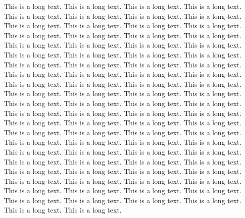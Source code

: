 \documentclass[twoside]{article}
\begin{document}
This is a long text. This is a long text.
This is a long text. This is a long text.
This is a long text. This is a long text.
This is a long text. This is a long text.
This is a long text. This is a long text.
This is a long text. This is a long text.
This is a long text. This is a long text.
This is a long text. This is a long text.
This is a long text. This is a long text.
This is a long text. This is a long text.
This is a long text. This is a long text.
This is a long text. This is a long text.
This is a long text. This is a long text.
This is a long text. This is a long text.
This is a long text. This is a long text.
This is a long text. This is a long text.
This is a long text. This is a long text.
This is a long text. This is a long text.
This is a long text. This is a long text.
This is a long text. This is a long text.
This is a long text. This is a long text.
This is a long text. This is a long text.
This is a long text. This is a long text.
This is a long text. This is a long text.
This is a long text. This is a long text.
This is a long text. This is a long text.
This is a long text. This is a long text.
This is a long text. This is a long text.
This is a long text. This is a long text.
This is a long text. This is a long text.
This is a long text. This is a long text.
This is a long text. This is a long text.
This is a long text. This is a long text.
This is a long text. This is a long text.
This is a long text. This is a long text.
This is a long text. This is a long text.
This is a long text. This is a long text.
This is a long text. This is a long text.
This is a long text. This is a long text.
This is a long text. This is a long text.
This is a long text. This is a long text.
This is a long text. This is a long text.
This is a long text. This is a long text.
\end{document}
